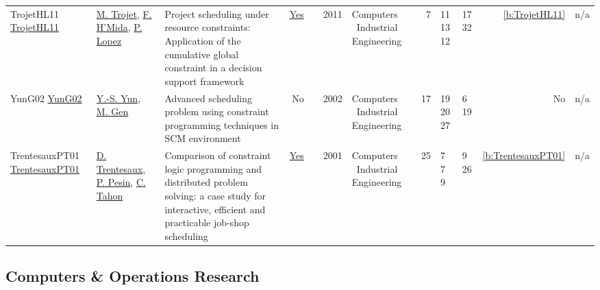 {\begin{longtable}{>{\raggedright\arraybackslash}p{3cm}>{\raggedright\arraybackslash}p{4.5cm}>{\raggedright\arraybackslash}p{6.0cm}rrrp{2.5cm}rp{1cm}p{1cm}rr}
TrojetHL11 \href{https://doi.org/10.1016/j.cie.2010.08.014}{TrojetHL11} & \hyperref[auth:a705]{M. Trojet}, \hyperref[auth:a706]{F. H'Mida}, \hyperref[auth:a3]{P. Lopez} & \cellcolor{green!10}Project scheduling under resource constraints: Application of the cumulative global constraint in a decision support framework & \href{../works/TrojetHL11.pdf}{Yes} & \cite{TrojetHL11} & 2011 & Computers \  Industrial Engineering & 7 & 11 13 12 & 17 32 & \ref{b:TrojetHL11} & n/a\\
YunG02 \href{http://dx.doi.org/10.1016/s0360-8352(02)00065-7}{YunG02} & \hyperref[auth:a1473]{Y.-S. Yun}, \hyperref[auth:a1474]{M. Gen} & Advanced scheduling problem using constraint programming techniques in SCM environment & No & \cite{YunG02} & 2002 & Computers \  Industrial Engineering & 17 & 19 20 27 & 6 19 & No & n/a\\
TrentesauxPT01 \href{https://www.sciencedirect.com/science/article/pii/S0360835200000784}{TrentesauxPT01} & \hyperref[auth:a1458]{D. Trentesaux}, \hyperref[auth:a1459]{P. Pesin}, \hyperref[auth:a1460]{C. Tahon} & Comparison of constraint logic programming and distributed problem solving: a case study for interactive, efficient and practicable job-shop scheduling & \href{../works/TrentesauxPT01.pdf}{Yes} & \cite{TrentesauxPT01} & 2001 & Computers \  Industrial Engineering & 25 & 7 7 9 & 9 26 & \ref{b:TrentesauxPT01} & n/a\\
\end{longtable}
}

\subsection{Computers \& Operations Research}

